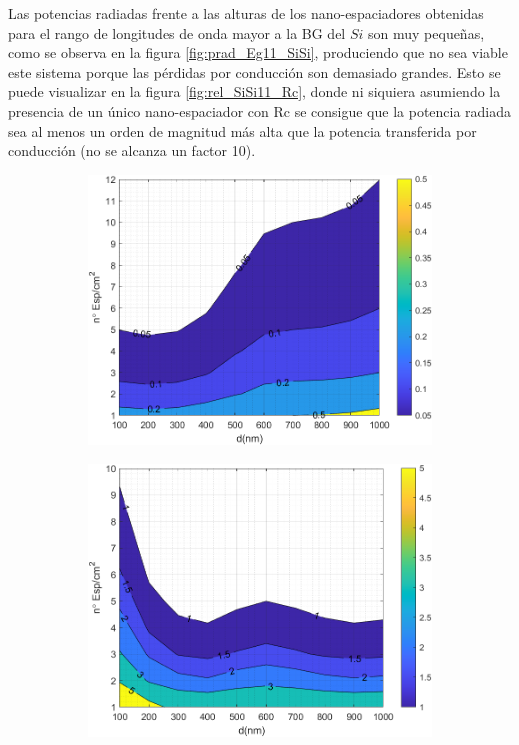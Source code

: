 Las potencias radiadas frente a las alturas de los nano-espaciadores obtenidas para el rango de longitudes de onda mayor a la BG del $Si$ son muy pequeñas, como se observa en la figura \ref{fig:prad_Eg11_SiSi}, produciendo que no sea viable este sistema porque las pérdidas por conducción son demasiado grandes. Esto se puede visualizar en la figura \ref{fig:rel_SiSi11_Rc}, donde ni siquiera asumiendo la presencia de un único nano-espaciador con Rc se consigue que la potencia radiada sea al menos un orden de magnitud más alta que la potencia transferida por conducción (no se alcanza un factor 10).
\begin{figure}[H]
	\centering
\begin{subfigure}[b]{0.49\textwidth}
	\centering
		\includegraphics[width=1.00\textwidth]{figuras/Resultados/RelacionCondRad/rel_SiSi11.pdf}
	\caption{ }
	\label{fig:rel_SiSi11}
\end{subfigure}
\hfill
\begin{subfigure}[b]{0.49\textwidth}
	\centering
		\includegraphics[width=1.00\textwidth]{figuras/Resultados/RelacionCondRad/rel_SiSi11_Rc.pdf}

\end{subfigure}
\end{figure}
